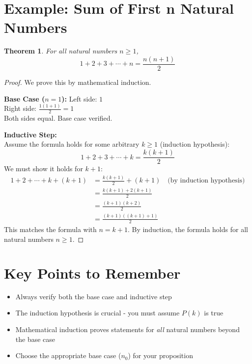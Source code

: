 \documentclass{article}
\newtheorem{theorem}{Theorem}
\begin{document}
\section{Example: Sum of First n Natural Numbers}
\begin{theorem}
    For all natural numbers $n \geq 1$,
    \[
        1 + 2 + 3 + \cdots + n = \frac{n(n+1)}{2}
    \]
\end{theorem}

\begin{proof}
    We prove this by mathematical induction.

    \textbf{Base Case ($n = 1$):}
    Left side: $1$ \\
    Right side: $\frac{1(1+1)}{2} = 1$ \\
    Both sides equal. Base case verified.

    \textbf{Inductive Step:} \\
    Assume the formula holds for some arbitrary $k \geq 1$ (induction hypothesis):
    \[
        1 + 2 + 3 + \cdots + k = \frac{k(k+1)}{2}
    \]
    We must show it holds for $k + 1$:
    \begin{align*}
        1 + 2 + \cdots + k + (k+1) & = \frac{k(k+1)}{2} + (k+1) \quad \text{(by induction hypothesis)} \\
                                   & = \frac{k(k+1) + 2(k+1)}{2}                                       \\
                                   & = \frac{(k+1)(k + 2)}{2}                                          \\
                                   & = \frac{(k+1)((k+1) + 1)}{2}
    \end{align*}
    This matches the formula with $n = k+1$. By induction, the formula holds for all natural numbers $n \geq 1$.
\end{proof}

\section{Key Points to Remember}
\begin{itemize}
    \item Always verify both the base case and inductive step
    \item The induction hypothesis is crucial - you must assume $P(k)$ is true
    \item Mathematical induction proves statements for \textit{all} natural numbers beyond the base case
    \item Choose the appropriate base case ($n_0$) for your proposition
\end{itemize}
\end{document}

